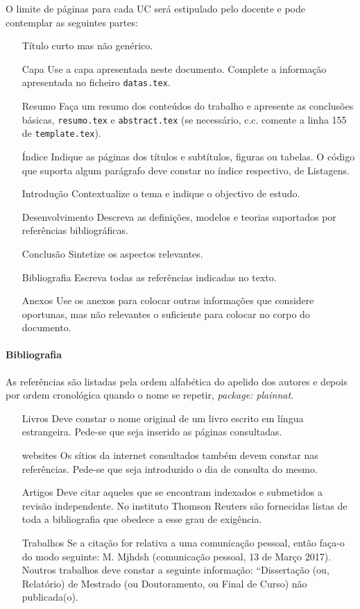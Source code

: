O limite de páginas para cada UC será estipulado pelo docente e pode contemplar as seguintes partes: 
\begin{enumerate}
\item[Título] curto mas não genérico.
\item[Capa] Use a capa apresentada neste documento. Complete a informação apresentada no ficheiro \texttt{datas.tex}.
\item[Resumo] Faça um resumo dos conteúdos do trabalho e apresente as conclusões básicas, \texttt{resumo.tex} e \texttt{abstract.tex} (se necessário, c.c. comente a linha 155 de \texttt{template.tex}).
\item[Índice] Indique as páginas dos títulos e subtítulos, figuras ou tabelas. O código que suporta algum parágrafo deve constar no índice respectivo, de Listagens.
\item[Introdução] Contextualize o tema e indique o objectivo de estudo.
\item[Desenvolvimento] Descreva as definições, modelos e teorias suportados por referências bibliográficas. 
\item[Conclusão] Sintetize os aspectos relevantes.
\item[Bibliografia] Escreva todas as referências indicadas no texto.
\item[Anexos] Use os anexos para colocar outras informações que considere oportunas, mas não relevantes o suficiente para colocar no corpo do documento. 
\end{enumerate}

\paragraph{Bibliografia}
As referências são listadas pela ordem alfabética do apelido dos autores e depois por ordem cronológica quando o nome se repetir, \textit{package: plainnat}. 

\begin{enumerate}
\item[Livros] Deve constar o nome original de um livro escrito em língua estrangeira. Pede-se que seja inserido as páginas consultadas. 
\item[websites] Os sítios da internet consultados também devem constar nas referências. Pede-se que seja introduzido o dia de consulta do mesmo.
\item[Artigos] Deve citar aqueles que se encontram indexados e submetidos a revisão independente. No instituto Thomson Reuters são fornecidas listas de toda a bibliografia que obedece a esse grau de exigência.
\item[Trabalhos] Se a citação for relativa a uma comunicação pessoal, então faça-o do modo seguinte: M. Mjhdsh (comunicação pessoal, 13 de Março 2017). Noutros trabalhos deve constar a seguinte informação: ``Dissertação (ou, Relatório) de Mestrado (ou Doutoramento, ou Final de Curso) não publicada(o). 
\end{enumerate}

